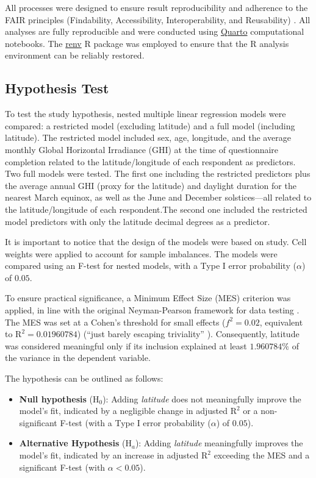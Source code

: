 \documentclass[
12pt,
openright,
oneside,
a4paper,
chapter=TITLE,
section=TITLE,
french,
spanish,
brazil,
english
]{abntex2}
\begin{document}
All processes were designed to ensure result reproducibility and
adherence to the FAIR principles (Findability, Accessibility,
Interoperability, and Reusability) \autocite{wilkinson2016}. All
analyses are fully reproducible and were conducted using
\href{https://quarto.org/}{Quarto} computational notebooks. The
\href{https://rstudio.github.io/renv/}{renv} R package \autocite{usheya}
was employed to ensure that the R analysis environment can be reliably
restored.

\subsection{Hypothesis Test}\label{hypothesis-test}

To test the study hypothesis, nested multiple linear regression models
were compared: a restricted model (excluding latitude) and a full model
(including latitude). The restricted model included sex, age, longitude,
and the average monthly Global Horizontal Irradiance (GHI) at the time
of questionnaire completion related to the latitude/longitude of each
respondent as predictors. Two full models were tested. The first one
including the restricted predictors plus the average annual GHI (proxy
for the latitude) and daylight duration for the nearest March equinox,
as well as the June and December solstices---all related to the
latitude/longitude of each respondent.The second one included the
restricted model predictors with only the latitude decimal degrees as a
predictor.

It is important to notice that the design of the models were based on
\textcite{leocadio-miguel2017} study. Cell weights were applied to
account for sample imbalances. The models were compared using an F-test
for nested models, with a Type I error probability (\(\alpha\)) of
\(0.05\).

To ensure practical significance, a Minimum Effect Size (MES) criterion
was applied, in line with the original Neyman-Pearson framework for data
testing \autocite{neyman1928,neyman1928a,perezgonzalez2015}. The MES was
set at a Cohen's threshold for small effects (\(f^2 = 0.02\), equivalent
to \(\text{R}^2 = 0.01960784\)) (``just barely escaping triviality''
\autocite[413]{cohen1988a}). Consequently, latitude was considered
meaningful only if its inclusion explained at least \(1.960784\%\) of
the variance in the dependent variable.

The hypothesis can be outlined as follows:

\begin{itemize}
\item
  \textbf{Null hypothesis} (\(\text{H}_{0}\)): Adding \emph{latitude}
  does not meaningfully improve the model's fit, indicated by a
  negligible change in adjusted \(\text{R}^{2}\) or a non-significant
  F-test (with a Type I error probability (\(\alpha\)) of \(0.05\)).
\item
  \textbf{Alternative Hypothesis} (\(\text{H}_{a}\)): Adding
  \emph{latitude} meaningfully improves the model's fit, indicated by an
  increase in adjusted \(\text{R}^{2}\) exceeding the MES and a
  significant F-test (with \(\alpha < 0.05\)).
\end{itemize}
\end{document}
